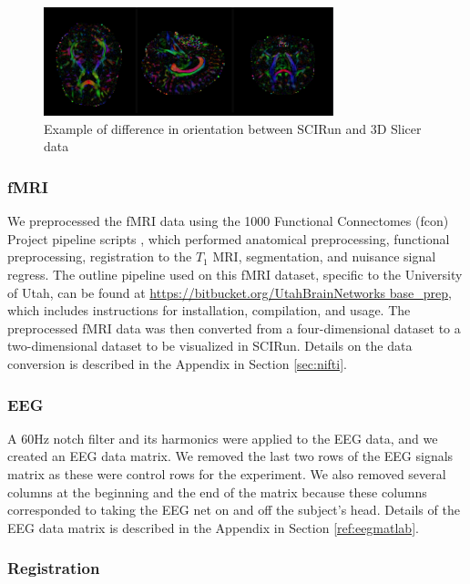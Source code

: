 \begin{figure}[H]
\begin{center}
\includegraphics[width=0.75\textwidth]{Figures/backwards.png}
\caption{Example of difference in orientation between SCIRun and 3D
  Slicer data}
\label{fig:backwards}
\end{center}
\end{figure}

\subsubsection{fMRI}
\label{sec:fmripre}

We preprocessed the fMRI data using the 1000 Functional Connectomes (fcon) Project pipeline scripts \cite{ref:fcon}, which performed anatomical preprocessing, functional preprocessing, registration to the $T_1$ MRI, segmentation, and nuisance signal regress. The outline pipeline used on this fMRI dataset, specific to the University of Utah, can be found at \url{https://bitbucket.org/UtahBrainNetworks base_prep}, which includes instructions for installation, compilation, and usage. The preprocessed fMRI data was then converted from a four-dimensional dataset to a two-dimensional dataset to be visualized in SCIRun. Details on the data conversion is described in the Appendix in Section \ref{sec:nifti}. 

\subsubsection{EEG}

A 60Hz notch filter and its harmonics \cite{ref:filter} were applied to the EEG data, and we created an EEG data matrix. We removed the last two rows of the EEG signals matrix as these were control rows for the experiment. We also removed several columns at the beginning and the end of the matrix because these columns corresponded to taking the EEG net on and off the subject's head. Details of the EEG data matrix is described in the Appendix in Section \ref{ref:eegmatlab}. 

\subsubsection{Registration}

